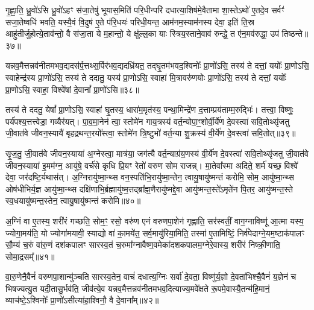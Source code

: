 गृ॒ह्णा॒ति॒ ध्रु॒वो॑\-ऽसि ध्रु॒वो॑\-ऽहꣳ स॑जा॒तेषु॑ भूयास॒मिति॑ परि॒धीन्परि॑ दधात्या॒शिष॑मे॒वैतामा शा॒स्ते\-ऽथो॑ ए॒तदे॒व सर्वꣳ॑ सजा॒तेष्वधि॑ भवति॒ यस्यै॒वं वि॒दुष॑ ए॒ते प॑रि॒धयः॑ परिधी॒यन्त॒ आम॑नम॒स्याम॑नस्य देवा॒ इति॑ ति॒स्र आहु॑तीर्जुहोत्ये॒ताव॑न्तो॒ वै स॑जा॒ता ये म॒हान्तो॒ ये क्षु॑ल्ल॒का याः स्त्रिय॒स्ताने॒वाव॑ रुन्द्धे॒ त ए॑न॒मव॑रुद्धा॒ उप॑ तिष्ठन्ते॥३७॥

{\anuvakamend[{स्वाहाम॑नमसि सजा॒तानाꣳ॑ रुन्द्धे॒ पञ्च॑ च॥९॥}]}

यन्नव॒मैत्तन्नव॑नीतमभव॒द्यदस॑र्प॒त्तथ्स॒र्पिर॑भव॒द्यदध्रि॑यत॒ तद्घृ॒तम॑भवद॒श्विनोः᳚ प्रा॒णो॑\-ऽसि॒ तस्य॑ ते दत्तां॒ ययोः᳚ प्रा॒णो\-ऽसि॒ स्वाहेन्द्र॑स्य प्रा॒णो॑\-ऽसि॒ तस्य॑ ते ददातु॒ यस्य॑ प्रा॒णो\-ऽसि॒ स्वाहा॑ मि॒त्रावरु॑णयोः प्रा॒णो॑\-ऽसि॒ तस्य॑ ते दत्तां॒ ययोः᳚ प्रा॒णो\-ऽसि॒ स्वाहा॒ विश्वे॑षां दे॒वानां᳚ प्रा॒णो॑\-ऽसि॥३८॥

तस्य॑ ते ददतु॒ येषां᳚ प्रा॒णो\-ऽसि॒ स्वाहा॑ घृ॒तस्य॒ धारा॑म॒मृत॑स्य॒ पन्था॒मिन्द्रे॑ण द॒त्ताम्प्रय॑ताम्म॒रुद्भिः॑। तत्त्वा॒ विष्णुः॒ पर्य॑पश्य॒त्तत्त्वेडा॒ गव्यैर॑यत्। पा॒व॒मा॒नेन॑ त्वा॒ स्तोमे॑न गाय॒त्रस्य॑ वर्त॒न्योपा॒ꣳ॒शोर्वी॒र्ये॑ण दे॒वस्त्वा॑ सवि॒तोथ्सृ॑जतु जी॒वात॑वे जीवन॒स्यायै॑ बृहद्रथन्त॒रयो᳚स्त्वा॒ स्तोमे॑न त्रि॒ष्टुभो॑ वर्त॒न्या शु॒क्रस्य॑ वी॒र्ये॑ण दे॒वस्त्वा॑ सवि॒तोत्॥३९॥

सृ॒ज॒तु॒ जी॒वात॑वे जीवन॒स्याया॑ अ॒ग्नेस्त्वा॒ मात्र॑या॒ जग॑त्यै वर्त॒न्याग्र॑य॒णस्य॑ वी॒र्ये॑ण दे॒वस्त्वा॑ सवि॒तोथ्सृ॑जतु जी॒वात॑वे जीवन॒स्याया॑ इ॒मम॑ग्न॒ आयु॑षे॒ वर्च॑से कृधि प्रि॒यꣳ रेतो॑ वरुण सोम राजन्न्। मा॒तेवा᳚स्मा अदिते॒ शर्म॑ यच्छ॒ विश्वे॑ देवा॒ जर॑दष्टि॒र्यथास॑त्। अ॒ग्निरायु॑ष्मा॒न्थ्स वन॒स्पति॑भि॒रायु॑ष्मा॒न्तेन॒ त्वायु॒षायु॑ष्मन्तं करोमि॒ सोम॒ आयु॑ष्मा॒न्थ्स ओष॑धीभिर्य॒ज्ञ आयु॑ष्मा॒न्थ्स दक्षि॑णाभि॒र्ब्रह्मायु॑ष्म॒त्तद्ब्रा᳚ह्म॒णैरायु॑ष्मद्दे॒वा आयु॑ष्मन्त॒स्ते॑\-ऽमृते॑न पि॒तर॒ आयु॑ष्मन्त॒स्ते स्व॒धयायु॑ष्मन्त॒स्तेन॒ त्वायु॒षायु॑ष्मन्तं करोमि॥४०॥

{\anuvakamend[{विश्वे॑षां दे॒वानां᳚ प्रा॒णो॑\-ऽसि त्रि॒ष्टुभो॑ वर्त॒न्या शु॒क्रस्य॑ वी॒र्ये॑ण दे॒वस्त्वा॑ सवि॒तोत्सोम॒ आयु॑ष्मा॒न्पञ्च॑विꣳशतिश्च॥10॥}]}

अ॒ग्निं वा ए॒तस्य॒ शरी॑रं गच्छति॒ सोम॒ꣳ॒ रसो॒ वरु॑ण एनं वरुणपा॒शेन॑ गृह्णाति॒ सर॑स्वतीं॒ वाग॒ग्नाविष्णू॑ आ॒त्मा यस्य॒ ज्योगा॒मय॑ति॒ यो ज्योगा॑मयावी॒ स्याद्यो वा॑ का॒मये॑त॒ सर्व॒मायु॑रिया॒मिति॒ तस्मा॑ ए॒तामिष्टिं॒ निर्व॑पेदाग्ने॒यम॒ष्टाक॑पालꣳ सौ॒म्यं च॒रुं वा॑रु॒णं दश॑कपालꣳ सारस्व॒तं च॒रुमा᳚ग्नावैष्ण॒वमेका॑दशकपालम॒ग्नेरे॒वास्य॒ शरी॑रं निष्क्री॒णाति॒ सोमा॒द्रसम्᳚॥४१॥

वा॒रु॒णेनै॒वैनं॑ वरुणपा॒शान्मु॑ञ्चति सारस्व॒तेन॒ वाचं॑ दधात्य॒ग्निः सर्वा॑ दे॒वता॒ विष्णु॑र्य॒ज्ञो दे॒वता॑भिश्चै॒वैनं॑ य॒ज्ञेन॑ च भिषज्यत्यु॒त यदी॒तासु॒र्भव॑ति॒ जीव॑त्ये॒व यन्नव॒मैत्तन्नव॑नीतमभव॒दित्याज्य॒मवे᳚क्षते रू॒पमे॒वास्यै॒तन्म॑हि॒मानं॒ व्याच॑ष्टे॒\-ऽश्विनोः᳚ प्रा॒णो॑\-ऽसीत्या॑हा॒श्विनौ॒ वै दे॒वाना᳚म्॥४२॥

